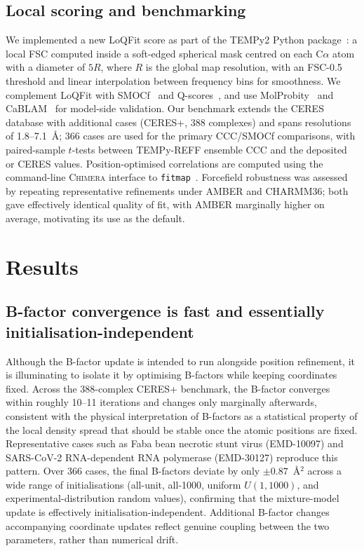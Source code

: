 \documentclass[11pt]{article}
\begin{document}
\subsection{Local scoring and benchmarking}
We implemented a new LoQFit score as part of the TEMPy2 Python package~\cite{farabella2015}: a local FSC computed inside a soft-edged spherical mask centred on each C$\alpha$ atom with a diameter of $5R$, where $R$ is the global map resolution, with an FSC-0.5 threshold and linear interpolation between frequency bins for smoothness. We complement LoQFit with SMOCf~\cite{farabella2015,joseph2017} and Q-scores~\cite{pintilie2020}, and use MolProbity~\cite{williams2018,chen2010} and CaBLAM~\cite{williams2018} for model-side validation. Our benchmark extends the CERES~\cite{liebschner2019} database with additional cases (CERES+, 388 complexes) and spans resolutions of 1.8--7.1~\AA; 366 cases are used for the primary CCC/SMOCf comparisons, with paired-sample $t$-tests between TEMPy-REFF ensemble CCC and the deposited or CERES values. Position-optimised correlations are computed using the command-line \textsc{Chimera} interface to \texttt{fitmap}~\cite{goddard2018,pettersen2021}. Forcefield robustness was assessed by repeating representative refinements under AMBER and CHARMM36; both gave effectively identical quality of fit, with AMBER marginally higher on average, motivating its use as the default.

\section{Results}

\subsection{B-factor convergence is fast and essentially initialisation-independent}
Although the B-factor update is intended to run alongside position refinement, it is illuminating to isolate it by optimising B-factors while keeping coordinates fixed. Across the 388-complex CERES+ benchmark, the B-factor converges within roughly 10--11 iterations and changes only marginally afterwards, consistent with the physical interpretation of B-factors as a statistical property of the local density spread that should be stable once the atomic positions are fixed. Representative cases such as Faba bean necrotic stunt virus (EMD-10097) and SARS-CoV-2 RNA-dependent RNA polymerase (EMD-30127) reproduce this pattern. Over 366 cases, the final B-factors deviate by only $\pm 0.87$~\AA$^{2}$ across a wide range of initialisations (all-unit, all-1000, uniform $U(1,1000)$, and experimental-distribution random values), confirming that the mixture-model update is effectively initialisation-independent. Additional B-factor changes accompanying coordinate updates reflect genuine coupling between the two parameters, rather than numerical drift.
\end{document}
